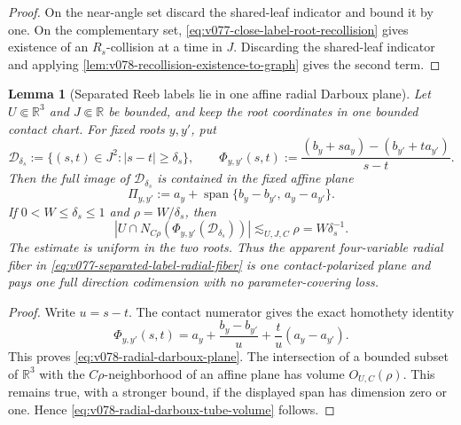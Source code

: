 \documentclass[10pt]{article}
\newtheorem{lemma}[theorem]{Lemma}
\begin{document}
\begin{proof}
On the near-angle set discard the shared-leaf indicator and bound it by one.  On the complementary
set, \eqref{eq:v077-close-label-root-recollision} gives existence of an \(R_s\)-collision at a time
in \(J\).  Discarding the shared-leaf indicator and applying
\cref{lem:v078-recollision-existence-to-graph} gives the second term.
\end{proof}

\begin{lemma}[Separated Reeb labels lie in one affine radial Darboux plane]
\label{lem:v078-radial-darboux-surface}
Let \(U\Subset\mathbb R^3\) and \(J\Subset\mathbb R\) be bounded, and keep the root coordinates in
one bounded contact chart.  For fixed roots \(y,y'\), put
\[
\mathcal D_{\delta_s}
:=
\{(s,t)\in J^2:|s-t|\ge\delta_s\},
\qquad
\Phi_{y,y'}(s,t)
:=
\frac{(b_y+s a_y)-(b_{y'}+t a_{y'})}{s-t}.
\]
Then the full image of \(\mathcal D_{\delta_s}\) is contained in the fixed affine plane
\begin{equation}
\label{eq:v078-radial-darboux-plane}
\boxed{
\Pi_{y,y'}
:=
a_y+\operatorname{span}\{b_y-b_{y'},\,a_y-a_{y'}\}.
}
\end{equation}
If \(0<W\le\delta_s\le1\) and \(\rho=W/\delta_s\), then
\begin{equation}
\label{eq:v078-radial-darboux-tube-volume}
\boxed{
\left|
U\cap N_{C\rho}\!\left(\Phi_{y,y'}(\mathcal D_{\delta_s})\right)
\right|
\lesssim_{U,J,C}
\rho
=
W\delta_s^{-1}.
}
\end{equation}
The estimate is uniform in the two roots.  Thus the apparent four-variable radial fiber in
\eqref{eq:v077-separated-label-radial-fiber} is one contact-polarized plane and pays one full
direction codimension with no parameter-covering loss.
\end{lemma}

\begin{proof}
Write \(u=s-t\).  The contact numerator gives the exact homothety identity
\[
\Phi_{y,y'}(s,t)
=
a_y+\frac{b_y-b_{y'}}u+\frac t u(a_y-a_{y'}).
\]
This proves \eqref{eq:v078-radial-darboux-plane}.  The intersection of a bounded subset of
\(\mathbb R^3\) with the \(C\rho\)-neighborhood of an affine plane has volume
\(O_{U,C}(\rho)\).  This remains true, with a stronger bound, if the displayed span has dimension
zero or one.  Hence \eqref{eq:v078-radial-darboux-tube-volume} follows.
\end{proof}
\end{document}
